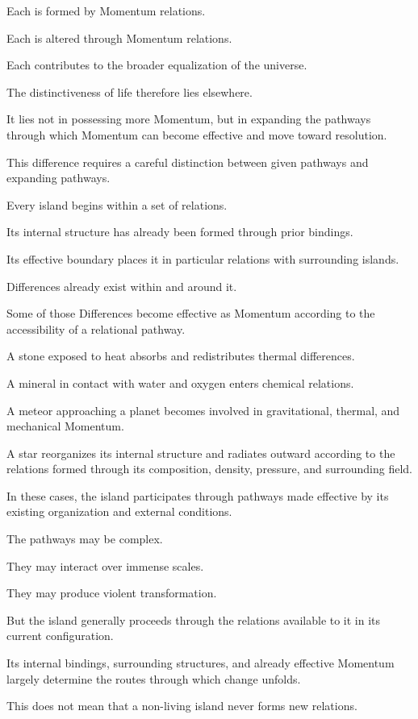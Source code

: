 Each is formed by Momentum relations.

Each is altered through Momentum relations.

Each contributes to the broader equalization of the universe.

The distinctiveness of life therefore lies elsewhere.

It lies not in possessing more Momentum, but in expanding the pathways through which Momentum can become effective and move toward resolution.

This difference requires a careful distinction between given pathways and expanding pathways.

Every island begins within a set of relations.

Its internal structure has already been formed through prior bindings.

Its effective boundary places it in particular relations with surrounding islands.

Differences already exist within and around it.

Some of those Differences become effective as Momentum according to the accessibility of a relational pathway.

A stone exposed to heat absorbs and redistributes thermal differences.

A mineral in contact with water and oxygen enters chemical relations.

A meteor approaching a planet becomes involved in gravitational, thermal, and mechanical Momentum.

A star reorganizes its internal structure and radiates outward according to the relations formed through its composition, density, pressure, and surrounding field.

In these cases, the island participates through pathways made effective by its existing organization and external conditions.

The pathways may be complex.

They may interact over immense scales.

They may produce violent transformation.

But the island generally proceeds through the relations available to it in its current configuration.

Its internal bindings, surrounding structures, and already effective Momentum largely determine the routes through which change unfolds.

This does not mean that a non-living island never forms new relations.

